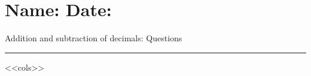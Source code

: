 \documentclass[leqno, 12pt]{article}
\def \HeadingQuestions {\section*{\Large Name: \underline{\hspace{8cm}} \hfill Date: \underline{\hspace{3cm}}} \vspace{-3mm}
{Addition and subtraction of decimals: Questions} \vspace{1pt}\hrule}
\begin{document}
    \HeadingQuestions
    \vspace{-5mm}
    \begin{multicols}{3}
        <<cols>>
    \end{multicols}
\end{document}
